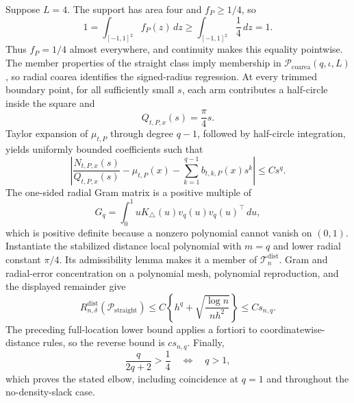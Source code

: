 Suppose \(L=4\).  The support has area four and \(f_P\geq1/4\), so
\[
 1=\int_{[-1,1]^2}f_P(z)\,dz
 \geq\int_{[-1,1]^2}\frac14\,dz=1.
\]
Thus \(f_P=1/4\) almost everywhere, and continuity makes this equality pointwise.  The member properties of the straight class imply membership in \(\mathcal P_{\mathrm{coarea}}(q,\iota,L)\), so radial coarea identifies the signed-radius regression.  At every trimmed boundary point, for all sufficiently small \(s\), each arm contributes a half-circle inside the square and
\[
 Q_{t,P,x}(s)=\frac\pi4s.
\]
Taylor expansion of \(\mu_{t,P}\) through degree \(q-1\), followed by half-circle integration, yields uniformly bounded coefficients such that
\[
 \left|\frac{N_{t,P,x}(s)}{Q_{t,P,x}(s)}-\mu_{t,P}(x)
 -\sum_{k=1}^{q-1}b_{t,k,P}(x)s^k\right|\leq Cs^q.
\]
The one-sided radial Gram matrix is a positive multiple of
\[
 G_q=\int_0^1uK_\triangle(u)v_q(u)v_q(u)^\top\,du,
\]
which is positive definite because a nonzero polynomial cannot vanish on \((0,1)\).  Instantiate the stabilized distance local polynomial with \(m=q\) and lower radial constant \(\pi/4\).  Its admissibility lemma makes it a member of \(\mathcal T_n^{\mathrm{dist}}\).  Gram and radial-error concentration on a polynomial mesh, polynomial reproduction, and the displayed remainder give
\[
 R_{n,\delta}^{\mathrm{dist}}(\mathcal P_{\mathrm{straight}})
 \leq C\left\{h^q+\sqrt{\frac{\log n}{nh^2}}\right\}
 \leq Cs_{n,q}.
\]
The preceding full-location lower bound applies a fortiori to coordinatewise-distance rules, so the reverse bound is \(cs_{n,q}\).  Finally,
\[
 \frac{q}{2q+2}>\frac14\quad\Longleftrightarrow\quad q>1,
\]
which proves the stated elbow, including coincidence at \(q=1\) and throughout the no-density-slack case.